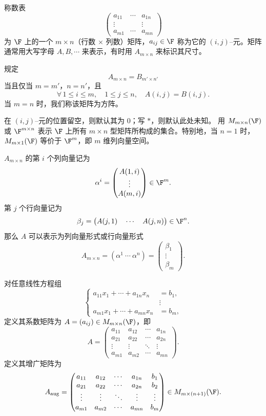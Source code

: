 \begin{definition}\label{p1:concept:c2-l654}
	称数表
	\[
	\begin{pmatrix}
		a_{11}&\cdots&a_{1n}\\
		\vdots&&\vdots\\
		a_{m1}&\cdots&a_{mn}
	\end{pmatrix}
	\]
	为 $\F$ 上的一个 $m\times n$（行数 $\times$ 列数）矩阵，$a_{ij}\in\F$ 称为它的 $(i,j)$--元。矩阵通常用大写字母 $A,B,\cdots$ 来表示，有时用 $A_{m\times n}$ 来标识其尺寸。
	
	规定
	\[
	A_{m\times n}=B_{m'\times n'}
	\]
	当且仅当 $m=m'$，$n=n'$，且
	\[
	\forall\,1\leq i\leq m,
	\quad 1\leq j\leq n,
	\quad A(i,j)=B(i,j).
	\]
	当 $m=n$ 时，我们称该矩阵为方阵。
	
	在 $(i,j)$--元的位置留空，则默认其为 $0$；写 $*$，则默认此处未知。
	用 $M_{m\times n}(\F)$ 或 $\F^{m\times n}$ 表示 $\F$ 上所有 $m\times n$ 型矩阵所构成的集合。特别地，当 $n=1$ 时，$M_{m\times 1}(\F)$ 等价于 $\F^m$，即 $m$ 维列向量空间。
	
	$A_{m\times n}$ 的第 $i$ 个列向量记为
	\[
	\alpha^i=
	\begin{pmatrix}
		A(1,i)\\
		\vdots\\
		A(m,i)
	\end{pmatrix}\in\F^m.
	\]
	第 $j$ 个行向量记为
	\[
	\beta_j=\bigl(A(j,1)\quad \cdots\quad A(j,n)\bigr)\in\F^n.
	\]
	那么 $A$ 可以表示为列向量形式或行向量形式
	\[
	A_{m\times n}=(\alpha^1\ \cdots\ \alpha^n)
	=
	\begin{pmatrix}
		\beta_1\\
		\vdots\\
		\beta_m
	\end{pmatrix}.
	\]
\end{definition}

\begin{definition}\label{p1:concept:c2-l705}
	对任意线性方程组
	\[
	\left\{
	\begin{aligned}
		a_{11}x_1+\cdots+a_{1n}x_n&=b_1,\\
		&\vdots\\
		a_{m1}x_1+\cdots+a_{mn}x_n&=b_m,
	\end{aligned}
	\right.
	\]
	定义其系数矩阵为 $A=(a_{ij})\in M_{m\times n}(\F)$，即
	\[
	A=
	\begin{pmatrix}
		a_{11}&a_{12}&\cdots&a_{1n}\\
		a_{21}&a_{22}&\cdots&a_{2n}\\
		\vdots&\vdots&\ddots&\vdots\\
		a_{m1}&a_{m2}&\cdots&a_{mn}
	\end{pmatrix}.
	\]
	定义其增广矩阵为
	\[
	A_{\mathrm{aug}}=
	\begin{pmatrix}
		a_{11}&a_{12}&\cdots&a_{1n}&b_1\\
		a_{21}&a_{22}&\cdots&a_{2n}&b_2\\
		\vdots&\vdots&\ddots&\vdots&\vdots\\
		a_{m1}&a_{m2}&\cdots&a_{mn}&b_m
	\end{pmatrix}
	\in M_{m\times(n+1)}(\F).
	\]
\end{definition}

